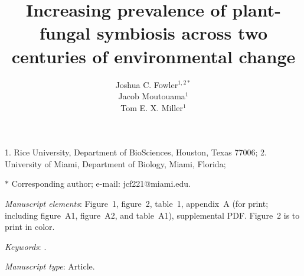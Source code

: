 \documentclass[11pt]{article}
\title{Increasing prevalence of plant-fungal symbiosis across two centuries of environmental change}
\author{Joshua C. Fowler$^{1,2\ast}$ \\
	Jacob Moutouama$^{1}$\\
	Tom E. X. Miller$^{1}$}
\date{}
\begin{document}
	
	\maketitle
	
	\noindent{} 1. Rice University, Department of BioSciences, Houston, Texas 77006;
	\noindent{} 2. University of Miami, Department of Biology, Miami, Florida;


	\noindent{} $\ast$ Corresponding author; e-mail: jcf221@miami.edu.
	
	\bigskip
	
	\textit{Manuscript elements}: Figure~1, figure~2, table~1, appendix~A (for print; including figure~A1, figure~A2, and table~A1), supplemental PDF. Figure~2 is to print in color.
	
	\bigskip
	
	\textit{Keywords}: .
	
	\bigskip
	
	\textit{Manuscript type}: Article. %
	
	\bigskip
	
	
	
	\newpage{}
	
\end{document}
